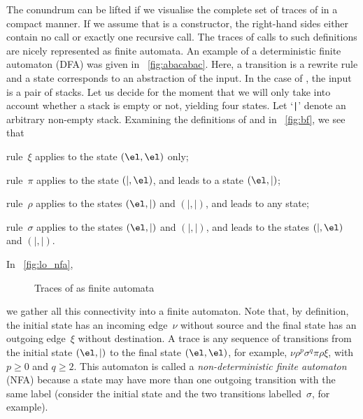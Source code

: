 The conundrum can be lifted if we visualise the complete set of
traces of
 in a compact manner. If we assume that
 is a constructor, the
right\hyp{}hand sides either contain no call or exactly one recursive
call. The traces of calls to such definitions are nicely represented
as finite automata. An example of a
deterministic finite automaton (DFA) was given in \fig~\vref{fig:abacabac}. Here, a
transition is a rewrite rule and a state corresponds to an abstraction
of the input. In the case of , the input is a pair of
stacks. Let us decide for the moment that we will only take into
account whether a stack is empty or not, yielding four states. Let
`\texttt{|}' denote an arbitrary non\hyp{}empty stack. Examining the
definitions of  and
 in \fig~\vref{fig:bf}, we see that
\begin{itemize*}

  \item rule~\(\xi\) applies to the state \((\el,\el)\) only;

  \item rule~\(\pi\) applies to the state \((\mid,\el)\), and leads to
    a state \((\el,\mid)\);

  \item rule~\(\rho\) applies to the states \((\el,\mid)\) and
    \((\mid,\mid)\), and leads to any state;

  \item rule~\(\sigma\) applies to the states \((\el,\mid)\) and
    \((\mid,\mid)\), and leads to the states \((\mid,\el)\) and
    \((\mid,\mid)\).

\end{itemize*}
In \fig~\vref{fig:lo_nfa},
\begin{figure}
\centering
{}
\quad
{}
\caption{Traces of  as finite automata}
\end{figure}
we gather all this connectivity into a finite automaton. Note that, by
definition, the initial state has an incoming edge~\(\nu\) without
source and the final state has an outgoing edge~\(\xi\) without
destination. A trace is any sequence of transitions from the initial
state \((\el,\mid)\) to the final state \((\el,\el)\), for example,
\(\nu\rho^p\sigma^q\pi\rho\xi\), with \(p \geqslant 0\) and \(q
\geqslant 2\). This automaton is called a \emph{non\hyp{}deterministic
  finite automaton} (NFA) because a state may have more than one outgoing
transition with the same label (consider the initial state and the two
transitions labelled~\(\sigma\), for example).

